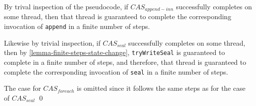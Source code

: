 \begin{prooftwo}

By trival inspection of the pseudocode, if $CAS_{append-inn}$ successfully
completes on some thread, then that thread is guaranteed to complete the
corresponding invocation of \verb=append= in a finite number of steps.

\enlargethispage{\baselineskip}

Likewise by trivial inspection, if $CAS_{seal}$ successfully completes on some
thread, then by \ref{lemma-finite-steps-state-change},
\verb=tryWriteSeal= is guaranteed to complete in a finite number of steps, and
therefore, that thread is guaranteed to complete the corresponding invocation
of \verb=seal= in a finite number of steps.

The case for $CAS_{foreach}$ is omitted since it follows the same steps as for the case
of $CAS_{seal}$
\qed
\end{prooftwo}
